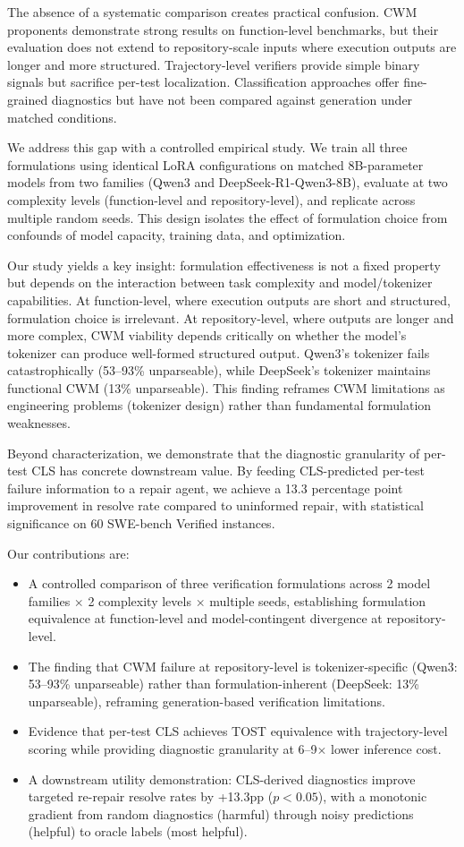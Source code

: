 \documentclass[11pt,a4paper]{article}
\begin{document}
The absence of a systematic comparison creates practical confusion. CWM proponents demonstrate strong results on function-level benchmarks, but their evaluation does not extend to repository-scale inputs where execution outputs are longer and more structured. Trajectory-level verifiers provide simple binary signals but sacrifice per-test localization. Classification approaches offer fine-grained diagnostics but have not been compared against generation under matched conditions.

We address this gap with a controlled empirical study. We train all three formulations using identical LoRA configurations on matched 8B-parameter models from two families (Qwen3 and DeepSeek-R1-Qwen3-8B), evaluate at two complexity levels (function-level and repository-level), and replicate across multiple random seeds. This design isolates the effect of formulation choice from confounds of model capacity, training data, and optimization.

Our study yields a key insight: formulation effectiveness is not a fixed property but depends on the interaction between task complexity and model/tokenizer capabilities. At function-level, where execution outputs are short and structured, formulation choice is irrelevant. At repository-level, where outputs are longer and more complex, CWM viability depends critically on whether the model's tokenizer can produce well-formed structured output. Qwen3's tokenizer fails catastrophically (53--93\% unparseable), while DeepSeek's tokenizer maintains functional CWM (13\% unparseable). This finding reframes CWM limitations as engineering problems (tokenizer design) rather than fundamental formulation weaknesses.

Beyond characterization, we demonstrate that the diagnostic granularity of per-test CLS has concrete downstream value. By feeding CLS-predicted per-test failure information to a repair agent, we achieve a 13.3 percentage point improvement in resolve rate compared to uninformed repair, with statistical significance on 60 SWE-bench Verified instances.

Our contributions are:
\begin{itemize}
\item A controlled comparison of three verification formulations across 2 model families $\times$ 2 complexity levels $\times$ multiple seeds, establishing formulation equivalence at function-level and model-contingent divergence at repository-level.
\item The finding that CWM failure at repository-level is tokenizer-specific (Qwen3: 53--93\% unparseable) rather than formulation-inherent (DeepSeek: 13\% unparseable), reframing generation-based verification limitations.
\item Evidence that per-test CLS achieves TOST equivalence with trajectory-level scoring while providing diagnostic granularity at 6--9$\times$ lower inference cost.
\item A downstream utility demonstration: CLS-derived diagnostics improve targeted re-repair resolve rates by +13.3pp ($p<0.05$), with a monotonic gradient from random diagnostics (harmful) through noisy predictions (helpful) to oracle labels (most helpful).
\end{itemize}
\end{document}
